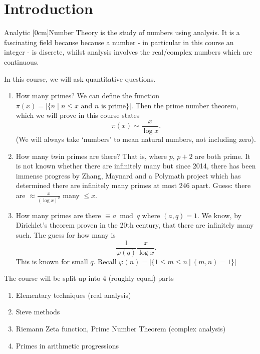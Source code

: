 \documentclass{article}
\begin{document}
\maketitle

\tableofcontents

\clearpage
\section{Introduction}
Analytic [0cm]Number Theory is the study of numbers using analysis. It is a fascinating field because because a number - in particular in this course an integer - is discrete, whilst analysis involves the real/complex numbers which are continuous.

In this course, we will ask quantitative questions.

\begin{eg}\leavevmode
  \begin{enumerate}
    \item How many primes? We can define the function $\pi(x) = |\{n \mid n \leq x \text{ and } n \text{ is prime} \}|$. Then the prime number theorem, which we will prove in this course states $$\pi(x) \sim \frac{x}{\log x}. $$
      (We will always take `numbers' to mean natural numbers, not including zero).
    \item  How many twin primes are there? That is, where $p,\,p+2$ are both prime.
      It is not known whether there are infinitely many but since 2014, there has been immense progress by Zhang, Maynard and a Polymath project which has determined there are infinitely many primes at most 246 apart.
      Guess: there are $\approx \frac{x}{(\log x)^2}$ many $\leq x$.
    \item How many primes are there $\equiv a \bmod q $ where $(a,q) = 1$. We know, by Dirichlet's theorem proven in the 20th century, that there are infinitely many such.
      The guess for how many is
      \begin{equation*}
        \frac{1}{\varphi(q)} \frac{x}{\log x}.
      \end{equation*}
      This is known for small $q$. Recall $\varphi(n) = |\{1\leq m \leq n \ | \ (m,n) =1 \}|$
  \end{enumerate}
\end{eg}
The course will be split up into 4 (roughly equal) parts
\begin{enumerate}
  \item Elementary techniques (real analysis)
  \item Sieve methods
  \item Riemann Zeta function, Prime Number Theorem (complex analysis)
  \item Primes in arithmetic progressions
\end{enumerate}
\clearpage
\end{document}
